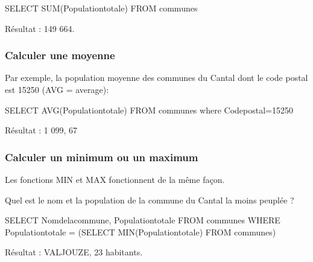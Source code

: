 \documentclass[
  letterpaper,
  DIV=11,
  numbers=noendperiod]{scrartcl}
\newenvironment{Shaded}{\begin{snugshade}}{\end{snugshade}}
\newcommand{\DecValTok}[1]{\textcolor[rgb]{0.68,0.00,0.00}{#1}}
\newcommand{\FunctionTok}[1]{\textcolor[rgb]{0.28,0.35,0.67}{#1}}
\newcommand{\KeywordTok}[1]{\textcolor[rgb]{0.00,0.23,0.31}{#1}}
\newcommand{\NormalTok}[1]{\textcolor[rgb]{0.00,0.23,0.31}{#1}}
\newcommand{\OperatorTok}[1]{\textcolor[rgb]{0.37,0.37,0.37}{#1}}
\begin{document}
\begin{Shaded}
\begin{Highlighting}[]
\KeywordTok{SELECT} \FunctionTok{SUM}\NormalTok{(Populationtotale)}
\KeywordTok{FROM}\NormalTok{ communes}
\end{Highlighting}
\end{Shaded}

Résultat : 149 664.

\hypertarget{calculer-une-moyenne}{%
\subsubsection{Calculer une moyenne}\label{calculer-une-moyenne}}

Par exemple, la population moyenne des communes du Cantal dont le code
postal est 15250 (AVG = average):

\begin{Shaded}
\begin{Highlighting}[]
\KeywordTok{SELECT} \FunctionTok{AVG}\NormalTok{(Populationtotale)}
\KeywordTok{FROM}\NormalTok{ communes}
\KeywordTok{where}\NormalTok{ Codepostal}\OperatorTok{=}\DecValTok{15250}
\end{Highlighting}
\end{Shaded}

Résultat : 1 099, 67

\hypertarget{calculer-un-minimum-ou-un-maximum}{%
\subsubsection{Calculer un minimum ou un
maximum}\label{calculer-un-minimum-ou-un-maximum}}

Les fonctions MIN et MAX fonctionnent de la même façon.

Quel est le nom et la population de la commune du Cantal la moins
peuplée ?

\begin{Shaded}
\begin{Highlighting}[]
\KeywordTok{SELECT}\NormalTok{ Nomdelacommune, Populationtotale}
\KeywordTok{FROM}\NormalTok{ communes}
\KeywordTok{WHERE}\NormalTok{ Populationtotale }\OperatorTok{=}\NormalTok{ (}\KeywordTok{SELECT} \FunctionTok{MIN}\NormalTok{(Populationtotale) }\KeywordTok{FROM}\NormalTok{ communes)}
\end{Highlighting}
\end{Shaded}

Résultat : VALJOUZE, 23 habitants.
\end{document}
